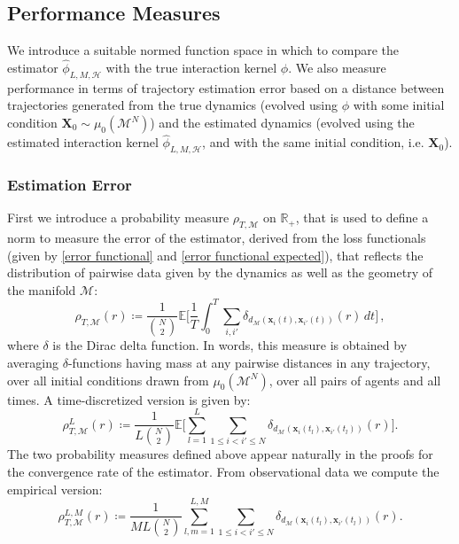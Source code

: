 \documentclass[11pt]{article}
\newcommand{\mbf}[1]{\boldsymbol{#1}}
\newcommand{\bx}{\mbf{x}}
\newcommand{\bX}{\mbf{X}}
\newcommand{\mH}{\mathcal{H}}
\newcommand{\mM}{\mathcal{M}}
\newcommand{\intkernel}{\phi}
\newcommand{\lintkernel}{\widehat{\intkernel}}
\newcommand{\E}{\mathbb{E}}
\newcommand{\probIC}{\mu_0}
\newcommand{\muX}{\probIC(\mM^N)}
\begin{document}
\subsection{Performance Measures}
%

We introduce a suitable normed function space in which to compare the estimator $\lintkernel_{L, M, \mH}$ with the true interaction kernel $\intkernel$. We also measure performance in terms of trajectory estimation error based on a distance between trajectories generated from the true dynamics (evolved using $\intkernel$ with some initial condition $\bX_0 \sim \muX$) and the estimated dynamics (evolved using the estimated interaction kernel $\lintkernel_{L, M, \mH}$, and with the same initial condition, i.e. $\bX_0$).

\subsubsection{Estimation Error}
First we introduce a probability measure $\rho_{T, \mM}$ on $\mathbb{R}_+$, that is used to define a norm to measure the error of the estimator, derived from the loss functionals (given by \eqref{error functional} and \eqref{error functional expected}), that reflects the distribution of pairwise data given by the dynamics as well as the geometry of the manifold $\mM$:
\begin{equation*}
\rho_{T, \mM}(r) \coloneqq \frac{1}{\binom{N}{2}}\E\Big[ \frac1T\int_{0}^T\sum_{i,i'} \delta_{d_{\mM}(\bx_i(t), \bx_{i'}(t))}(r)\, dt\Big]\,,
\end{equation*}
where $\delta$ is the Dirac delta function.  In words, this measure is obtained by averaging $\delta$-functions having mass at any pairwise distances in any trajectory, over all initial conditions drawn from $\muX$,  over all pairs of agents and all times.  A time-discretized version is given by:
\begin{equation*}
\rho_{T, \mM}^L(r) \coloneqq \frac{1}{L\binom{N}{2}}\E\Big[\sum_{l=1}^L\sum_{1 \le i < i' \le N} \delta_{d_{\mM}(\bx_i(t_l), \bx_{i'}(t_l))}(r)\Big].
\end{equation*}
The two probability measures defined above appear naturally in the proofs for the convergence rate of the estimator.
From observational data we compute the empirical version:
\begin{equation*}
\rho_{T, \mM}^{L, M}(r) \coloneqq \frac{1}{ML\binom{N}{2}}\sum_{l, m = 1}^{L, M}\sum_{1 \le i < i' \le N}\delta_{d_{\mM}(\bx_i(t_l), \bx_{i'}(t_l))}(r).
\end{equation*}
\end{document}

